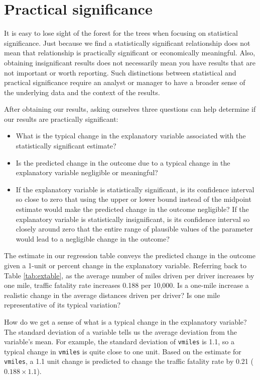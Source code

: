 \documentclass[
]{book}
\providecommand{\tightlist}{%
  \setlength{\itemsep}{0pt}\setlength{\parskip}{0pt}}
\begin{document}
\hypertarget{practical-significance}{%
\section{Practical significance}\label{practical-significance}}

It is easy to lose sight of the forest for the trees when focusing on statistical significance. Just because we find a statistically significant relationship does not mean that relationship is practically significant or economically meaningful. Also, obtaining insignificant results does not necessarily mean you have results that are not important or worth reporting. Such distinctions between statistical and practical significance require an analyst or manager to have a broader sense of the underlying data and the context of the results.

After obtaining our results, asking ourselves three questions can help determine if our results are practically significant:

\begin{itemize}
\tightlist
\item
  What is the typical change in the explanatory variable associated with the statistically significant estimate?
\item
  Is the predicted change in the outcome due to a typical change in the explanatory variable negligible or meaningful?
\item
  If the explanatory variable is statistically significant, is its confidence interval so close to zero that using the upper or lower bound instead of the midpoint estimate would make the predicted change in the outcome negligible? If the explanatory variable is statistically insignificant, is its confidence interval so closely around zero that the entire range of plausible values of the parameter would lead to a negligible change in the outcome?
\end{itemize}

The estimate in our regression table conveys the predicted change in the outcome given a 1-unit or percent change in the explanatory variable. Referring back to Table \ref{tab:extable}, as the average number of miles driven per driver increases by one mile, traffic fatality rate increases 0.188 per 10,000. Is a one-mile increase a realistic change in the average distances driven per driver? Is one mile representative of its typical variation?

How do we get a sense of what is a typical change in the explanatory variable? The standard deviation of a variable tells us the average deviation from the variable's mean. For example, the standard deviation of \texttt{vmiles} is 1.1, so a typical change in \texttt{vmiles} is quite close to one unit. Based on the estimate for \texttt{vmiles}, a 1.1 unit change is predicted to change the traffic fatality rate by 0.21 (\(0.188 \times 1.1\)).
\end{document}
